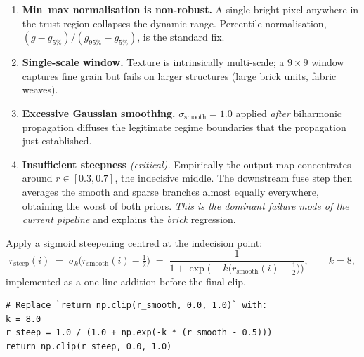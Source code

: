 \documentclass[11pt,a4paper]{article}
\begin{document}
\begin{issuebox}
\begin{enumerate}[leftmargin=1.2em,itemsep=2pt]
    \item \textbf{Min--max normalisation is non-robust.} A single bright
    pixel anywhere in the trust region collapses the dynamic range.
    Percentile normalisation, $(g - g_{5\%})/(g_{95\%} - g_{5\%})$, is the
    standard fix.
    \item \textbf{Single-scale window.} Texture is intrinsically
    multi-scale; a $9\times 9$ window captures fine grain but fails on
    larger structures (large brick units, fabric weaves).
    \item \textbf{Excessive Gaussian smoothing.} $\sigma_{\mathrm{smooth}}
    = 1.0$ applied \emph{after} biharmonic propagation diffuses the
    legitimate regime boundaries that the propagation just established.
    \item \textbf{Insufficient steepness} \emph{(critical).} Empirically
    the output map concentrates around $r\in[0.3, 0.7]$, the indecisive
    middle. The downstream fuse step then averages the smooth and sparse
    branches almost equally everywhere, obtaining the worst of both
    priors. \emph{This is the dominant failure mode of the current
    pipeline} and explains the \emph{brick} regression.
\end{enumerate}
\end{issuebox}

\begin{fixbox}
Apply a sigmoid steepening centred at the indecision point:
\begin{equation}
    r_{\mathrm{steep}}(i)
    \;=\; \sigma_{k}\!\bigl(r_{\mathrm{smooth}}(i) - \tfrac{1}{2}\bigr)
    \;=\; \frac{1}{1 + \exp\!\bigl(-k\bigl(r_{\mathrm{smooth}}(i) -
    \tfrac{1}{2}\bigr)\bigr)},
    \qquad k = 8,
    \label{eq:sigmoid}
\end{equation}
implemented as a one-line addition before the final clip.
\end{fixbox}

\begin{lstlisting}[caption={Sigmoid steepening of the regime map.}]
# Replace `return np.clip(r_smooth, 0.0, 1.0)` with:
k = 8.0
r_steep = 1.0 / (1.0 + np.exp(-k * (r_smooth - 0.5)))
return np.clip(r_steep, 0.0, 1.0)
\end{lstlisting}
\end{document}
